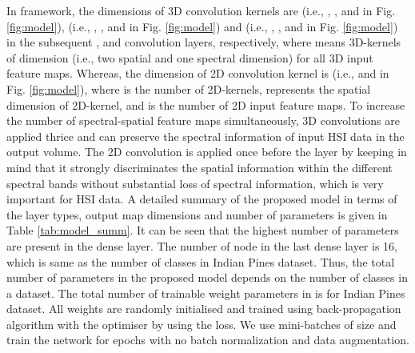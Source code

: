 \documentclass[journal]{IEEEtran}
\begin{document}
In  framework, the dimensions of 3D convolution kernels are  (i.e., , , and  in Fig. \ref{fig:model}),  (i.e., , , and  in Fig. \ref{fig:model}) and  (i.e., , , and  in Fig. \ref{fig:model}) in the subsequent ,  and  convolution layers, respectively, where  means  3D-kernels of dimension  (i.e., two spatial and one spectral dimension) for all  3D input feature maps. Whereas, the dimension of 2D convolution kernel is  (i.e.,  and  in Fig. \ref{fig:model}), where  is the number of 2D-kernels,  represents the spatial dimension of 2D-kernel, and  is the number of 2D input feature maps. 
To increase the number of spectral-spatial feature maps simultaneously, 3D convolutions are applied thrice and can preserve the spectral information of input HSI data in the output volume. The 2D convolution is applied once before the  layer by keeping in mind that it strongly discriminates the spatial information within the different spectral bands without substantial loss of spectral information, which is very important for HSI data. A detailed summary of the proposed model in terms of the layer types, output map dimensions and number of parameters is given in Table \ref{tab:model_summ}. It can be seen that the highest number of parameters are present in the  dense layer. The number of node in the last dense layer is 16, which is same as the number of classes in Indian Pines dataset. Thus, the total number of parameters in the proposed model depends on the number of classes in a dataset. The total number of trainable weight parameters in  is  for Indian Pines dataset. All weights are randomly initialised and trained using back-propagation algorithm with the  optimiser by using the  loss. We use mini-batches of size  and train the  network for  epochs with no batch normalization and data augmentation.
\end{document}
